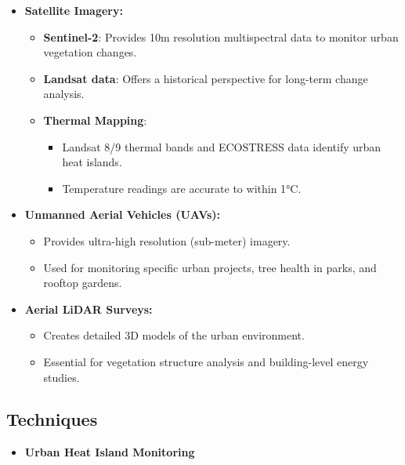 \documentclass[
  letterpaper,
  DIV=11,
  numbers=noendperiod]{scrreprt}
\providecommand{\tightlist}{%
  \setlength{\itemsep}{0pt}\setlength{\parskip}{0pt}}\usepackage{longtable,booktabs,array}
\begin{document}
\begin{itemize}
\tightlist
\item
  \textbf{Satellite Imagery:}

  \begin{itemize}
  \tightlist
  \item
    \textbf{Sentinel-2}: Provides 10m resolution multispectral data to
    monitor urban vegetation changes.
  \item
    \textbf{Landsat data}: Offers a historical perspective for long-term
    change analysis.
  \item
    \textbf{Thermal Mapping}:

    \begin{itemize}
    \tightlist
    \item
      Landsat 8/9 thermal bands and ECOSTRESS data identify urban heat
      islands.
    \item
      Temperature readings are accurate to within 1°C.
    \end{itemize}
  \end{itemize}
\item
  \textbf{Unmanned Aerial Vehicles (UAVs):}

  \begin{itemize}
  \tightlist
  \item
    Provides ultra-high resolution (sub-meter) imagery.
  \item
    Used for monitoring specific urban projects, tree health in parks,
    and rooftop gardens.
  \end{itemize}
\item
  \textbf{Aerial LiDAR Surveys:}

  \begin{itemize}
  \tightlist
  \item
    Creates detailed 3D models of the urban environment.
  \item
    Essential for vegetation structure analysis and building-level
    energy studies.
  \end{itemize}
\end{itemize}

\subsection{Techniques}\label{techniques}

\begin{itemize}
\tightlist
\item
  \textbf{Urban Heat Island Monitoring}
\end{itemize}
\end{document}
